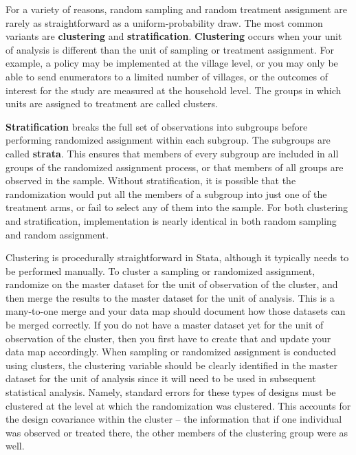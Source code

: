 For a variety of reasons, random sampling and random treatment assignment
are rarely as straightforward as a uniform-probability draw.
The most common variants are \textbf{clustering} and \textbf{stratification}.
\textbf{Clustering} occurs when your unit of analysis is different
than the unit of sampling or treatment assignment.
For example, a policy may be implemented at the village level,
or you may only be able to send enumerators to a limited number of villages,
or the outcomes of interest for the study are measured at the household level.
The groups in which units are assigned to treatment are called clusters.

\textbf{Stratification} breaks the full set of observations into subgroups
before performing randomized assignment within each subgroup.
The subgroups are called \textbf{strata}.
This ensures that members of every subgroup
are included in all groups of the randomized assignment process,
or that members of all groups are observed in the sample.
Without stratification, it is possible that the randomization
would put all the members of a subgroup into just one of the treatment arms,
or fail to select any of them into the sample.
For both clustering and stratification,
implementation is nearly identical in both random sampling and random assignment.

Clustering is procedurally straightforward in Stata,
although it typically needs to be performed manually.
To cluster a sampling or randomized assignment,
randomize on the master dataset for the unit of observation of the cluster,
and then merge the results to the master dataset for the unit of analysis.
This is a many-to-one merge and your data map should document
how those datasets can be merged correctly.
If you do not have a master dataset yet for the unit of observation of the cluster,
then you first have to create that and update your data map accordingly.
When sampling or randomized assignment is conducted using clusters,
the clustering variable should be clearly identified in the master dataset
for the unit of analysis
since it will need to be used in subsequent statistical analysis.
Namely, standard errors for these types of designs must be clustered
at the level at which the randomization was clustered.
This accounts for the design covariance within the cluster --
the information that if one individual was observed or treated there,
the other members of the clustering group were as well.

